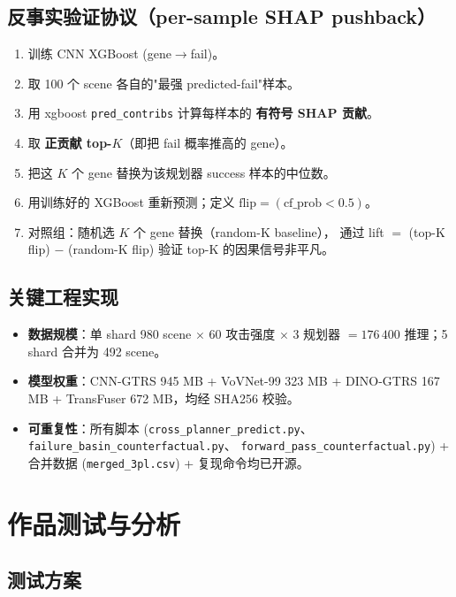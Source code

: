 \documentclass[a4paper,12pt,fontset=fandol]{ctexart}
\begin{document}
\subsection{反事实验证协议（per-sample SHAP pushback）}

\begin{enumerate}[leftmargin=*]
\item 训练 CNN XGBoost (gene$\to$fail)。
\item 取 100 个 scene 各自的"最强 predicted-fail"样本。
\item 用 xgboost \texttt{pred\_contribs} 计算每样本的
      \textbf{有符号 SHAP 贡献}。
\item 取 \textbf{正贡献 top-$K$}（即把 fail 概率推高的 gene）。
\item 把这 $K$ 个 gene 替换为该规划器 success 样本的中位数。
\item 用训练好的 XGBoost 重新预测；定义 $\text{flip}=(\text{cf\_prob}<0.5)$。
\item 对照组：随机选 $K$ 个 gene 替换（random-K baseline），
      通过 lift $=$ (top-K flip) $-$ (random-K flip) 验证 top-K
      的因果信号非平凡。
\end{enumerate}

\subsection{关键工程实现}

\begin{itemize}
\item \textbf{数据规模}：单 shard 980 scene $\times$ 60 攻击强度
      $\times$ 3 规划器 $= 176\,400$ 推理；5 shard 合并为 492 scene。
\item \textbf{模型权重}：CNN-GTRS 945 MB + VoVNet-99 323 MB +
      DINO-GTRS 167 MB + TransFuser 672 MB，均经 SHA256 校验。
\item \textbf{可重复性}：所有脚本 (\texttt{cross\_planner\_predict.py}、
      \texttt{failure\_basin\_counterfactual.py}、
      \texttt{forward\_pass\_counterfactual.py}) + 合并数据
      (\texttt{merged\_3pl.csv}) + 复现命令均已开源。
\end{itemize}

\newpage
\section{作品测试与分析}

\subsection{测试方案}
\end{document}
